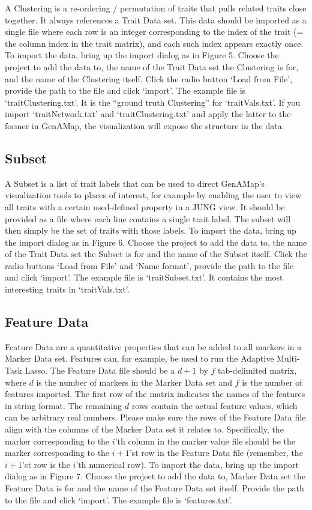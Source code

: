 \documentclass{article}
\begin{document}
A Clustering is a re-ordering / permutation of traits that pulls related traits close together. It always references a Trait Data set. This data should be imported as a single file where each row is an integer corresponding to the index of the trait (= the column index in the trait matrix), and each such index appears exactly once. To import the data, bring up the import dialog as in Figure 5. Choose the project to add the data to, the name of the Trait Data set the Clustering is for, and the name of the Clustering itself. Click the radio button `Load from File', provide the path to the file and click `import'. The example file is `traitClustering.txt'. It is the ``ground truth Clustering'' for `traitVals.txt'. If you import `traitNetwork.txt' and `traitClustering.txt' and apply the latter to the former in GenAMap, the visualization will expose the structure in the data.

\subsection{Subset}

A Subset is a list of trait labels that can be used to direct GenAMap's visualization tools to places of interest, for example by enabling the user to view all traits with a certain used-defined property in a JUNG view. It should be provided as a file where each line contains a single trait label. The subset will then simply be the set of traits with those labels. To import the data, bring up the import dialog as in Figure 6. Choose the project to add the data to, the name of the Trait Data set the Subset is for and the name of the Subset itself. Click the radio buttons `Load from File' and `Name format', provide the path to the file and click `import'. The example file is `traitSubset.txt'. It contains the most interesting traits in `traitVals.txt'.

\subsection{Feature Data}

Feature Data are a quantitative properties that can be added to all markers in a Marker Data set. Features can, for example, be used to run the Adaptive Multi-Task Lasso. The Feature Data file should be a $d+1$ by $f$ tab-delimited matrix, where $d$ is the number of markers in the Marker Data set and $f$ is the number of features imported. The first row of the matrix indicates the names of the features in string format. The remaining $d$ rows contain the actual feature values, which can be arbitrary real numbers. Please make sure the rows of the Feature Data file align with the columns of the Marker Data set it relates to. Specifically, the marker corresponding to the $i$'th column in the marker value file should be the marker corresponding to the $i+1$'st row in the Feature Data file (remember, the $i+1$'st row is the $i$'th numerical row). To import the data, bring up the import dialog as in Figure 7. Choose the project to add the data to, Marker Data set the Feature Data is for and the name of the Feature Data set itself. Provide the path to the file and click `import'. The example file is `features.txt'.
\end{document}
